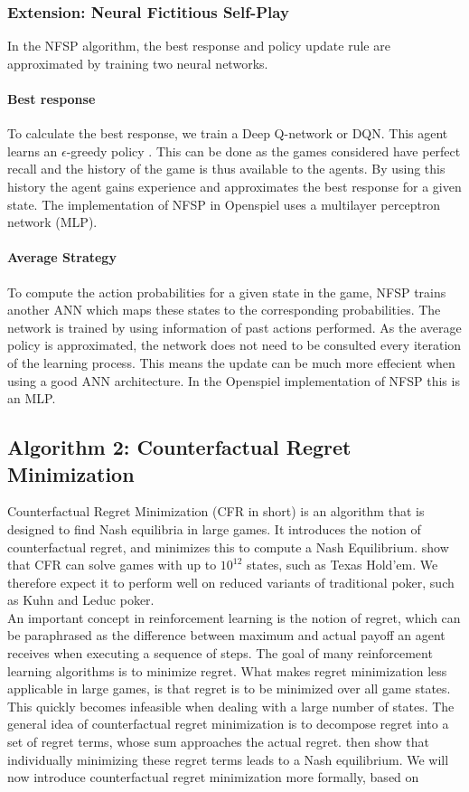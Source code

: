 \documentclass[10pt,a4paper]{article}
\begin{document}
\subsubsection{Extension: Neural Fictitious Self-Play}
\label{sub:nfsp}
In the NFSP algorithm, the best response and policy update rule are approximated by training two neural networks.
\paragraph{Best response}
To calculate the best response, we train a Deep Q-network or DQN. This agent learns an $\epsilon$-greedy policy \cite{heinrichphd}. 
This can be done as the games considered have perfect recall and the history of the game is thus available to the agents. By using this history the agent gains experience and approximates the best response for a given state.
The implementation of NFSP in Openspiel uses a multilayer perceptron network (MLP).
\paragraph{Average Strategy}
To compute the action probabilities for a given state in the game, NFSP trains another ANN which maps these states to the corresponding probabilities. The network is trained by using information of past actions performed. As the average policy is approximated, the network does not need to be consulted every iteration of the learning process. This means the update can be much more effecient when using a good ANN architecture.
In the Openspiel implementation of NFSP this is an MLP.
\subsection{Algorithm 2: Counterfactual Regret Minimization}
\label{sub:cfr}
Counterfactual Regret Minimization (CFR in short) is an algorithm that is designed to find Nash equilibria in large games. It introduces the notion of counterfactual regret, and minimizes this to compute a Nash Equilibrium. \citeauthor{cfr} \citep{cfr} show that CFR can solve games with up to $10^{12}$ states, such as Texas Hold'em. We therefore expect it to perform well on reduced variants of traditional poker, such as Kuhn and Leduc poker.\\

An important concept in reinforcement learning is the notion of regret, which can be paraphrased as the difference between maximum and actual payoff an agent receives when executing a sequence of steps. The goal of many reinforcement learning algorithms is to minimize regret. What makes regret minimization less applicable in large games, is that regret is to be minimized over all game states. This quickly becomes infeasible when dealing with a large number of states. The general idea of counterfactual regret minimization is to decompose regret into a set of regret terms, whose sum approaches the actual regret. \citeauthor{cfr} then show that individually minimizing these regret terms leads to a Nash equilibrium. We will now introduce counterfactual regret minimization more formally, based on \citep{cfr_for_beginners}\\
\end{document}
